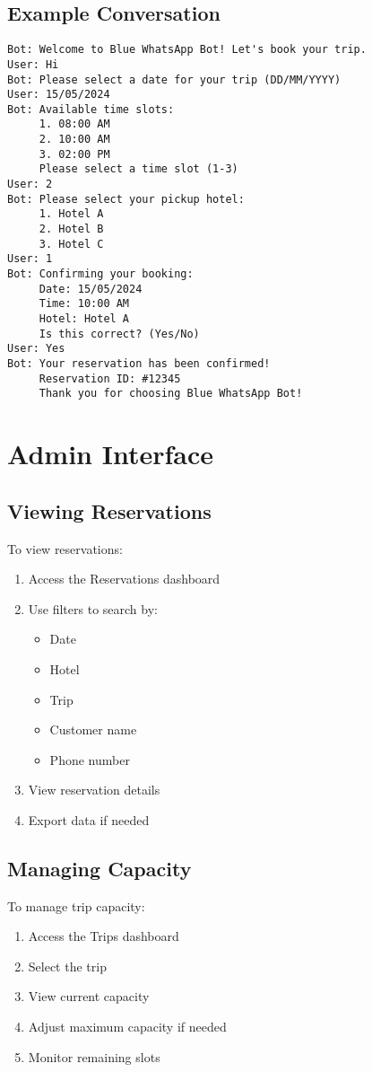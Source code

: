 \subsection{Example Conversation}
\begin{verbatim}
Bot: Welcome to Blue WhatsApp Bot! Let's book your trip.
User: Hi
Bot: Please select a date for your trip (DD/MM/YYYY)
User: 15/05/2024
Bot: Available time slots:
     1. 08:00 AM
     2. 10:00 AM
     3. 02:00 PM
     Please select a time slot (1-3)
User: 2
Bot: Please select your pickup hotel:
     1. Hotel A
     2. Hotel B
     3. Hotel C
User: 1
Bot: Confirming your booking:
     Date: 15/05/2024
     Time: 10:00 AM
     Hotel: Hotel A
     Is this correct? (Yes/No)
User: Yes
Bot: Your reservation has been confirmed!
     Reservation ID: #12345
     Thank you for choosing Blue WhatsApp Bot!
\end{verbatim}

\section{Admin Interface}

\subsection{Viewing Reservations}
To view reservations:
\begin{enumerate}
    \item Access the Reservations dashboard
    \item Use filters to search by:
        \begin{itemize}
            \item Date
            \item Hotel
            \item Trip
            \item Customer name
            \item Phone number
        \end{itemize}
    \item View reservation details
    \item Export data if needed
\end{enumerate}

\subsection{Managing Capacity}
To manage trip capacity:
\begin{enumerate}
    \item Access the Trips dashboard
    \item Select the trip
    \item View current capacity
    \item Adjust maximum capacity if needed
    \item Monitor remaining slots
\end{enumerate}

